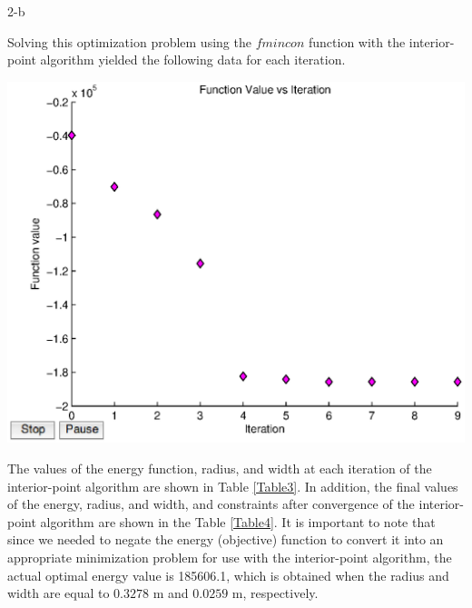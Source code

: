 \documentclass[11pt]{article}
\begin{document}
\begin{problem}{2-b}
\end{problem}
\begin{solution}
Solving this optimization problem using the $fmincon$ function with the interior-point algorithm yielded the following data for each iteration.

\begin{center}
\includegraphics[scale=0.75]{problem2/problem2.eps}
\end{center}

The values of the energy function, radius, and width at each iteration of the interior-point algorithm are shown in Table \ref{Table3}. In addition, the final values of the energy, radius, and width, and constraints after convergence of the interior-point algorithm are shown in the Table \ref{Table4}. It is important to note that since we needed to negate the energy (objective) function to convert it into an appropriate minimization problem for use with the interior-point algorithm, the actual optimal energy value is 185606.1, which is obtained when the radius and width are equal to $0.3278$ m and $0.0259$ m, respectively. 


\end{solution}
\end{document}
